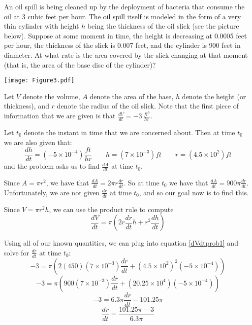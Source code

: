 \documentclass[handout,nooutcomes]{ximera}
\newcommand{\dd}[2][]{\frac{d #1}{d #2}}
\renewenvironment{freeResponse}{
\ifhandout\setbox0\vbox\bgroup\else
\begin{trivlist}\item[\hskip \labelsep\bfseries Solution:\hspace{2ex}]
\fi}
{\ifhandout\egroup\else
\end{trivlist}
\fi}
\begin{document}
\begin{problem}
An oil spill is being cleaned up by the deployment of bacteria that consume the oil at 3 cubic feet per hour.  The oil spill itself is modeled in the form of a very thin cylinder with height $h$ being the thickness of the oil slick (see the picture below).  Suppose at some moment in time, the height is decreasing at 0.0005 feet per hour, the thickness of the slick is 0.007 feet, and the cylinder is 900 feet in diameter.  At what rate is the area covered by the slick changing at that moment (that is, the area of the base disc of the cylinder)?
	\begin{image}
	\texttt{[image: Figure3.pdf]}
	\end{image}
	
		\begin{freeResponse}
		Let $V$ denote the volume, $A$ denote the area of the base, $h$ denote the height (or thickness), and $r$ denote the radius of the oil slick.  Note that the first piece of information that we are given is that $\dd[V]{t} = -3 \, \frac{ft^3}{hr}$.  
		
		Let $t_0$ denote the instant in time that we are concerned about.  Then at time $t_0$ we are also given that:
		$$ \dd[h]{t} = \left( -5 \times 10^{-4} \right) \frac{ft}{hr}  \qquad  h = \left( 7 \times 10^{-3} \right) ft  \qquad  r = \left( 4.5 \times 10^2 \right) ft $$
		and the problem asks us to find $\dd[A]{t}$ at time $t_0$.  
		
		Since $A = \pi r^2$, we have that $\dd[A]{t} = 2 \pi r \dd[r]{t}$.  So at time $t_0$ we have that $\dd[A]{t} = 900 \pi \dd[r]{t}$.  Unfortunately, we are not given $\dd[r]{t}$ at time $t_0$, and so our goal now is to find this.
		
		Since $V = \pi r^2 h$, we can use the product rule to compute
		\begin{equation}\label{dVdtprob1}
		\dd[V]{t} = \pi \left( 2r \dd[r]{t} h + r^2 \dd[h]{t} \right)
		\end{equation}
		
		Using all of our known quantities, we can plug into equation \ref{dVdtprob1} and solve for $\dd[r]{t}$ at time $t_0$:
		$$ -3 = \pi \left( 2(450)(7 \times 10^{-3}) \dd[r]{t} + (4.5 \times 10^2)^2(-5 \times 10^{-4}) \right) $$
		$$ -3 = \pi \left( 900(7 \times 10^{-3}) \dd[r]{t} + (20.25 \times 10^4) (-5 \times 10^{-4}) \right) $$
		$$ -3 = 6.3 \pi \dd[r]{t} -101.25 \pi $$
		$$ \dd[r]{t} = \frac{101.25 \pi - 3}{6.3 \pi} $$
		

\end{freeResponse}
\end{problem}
\end{document}
